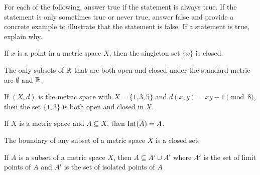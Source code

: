 \begin{comment}
	\item  Let $(X,d)$ be a metric space. Let $\{O_{\alpha}\}$ be a collection of open subsets of $X$ for $\alpha$ in some indexing set $I$ with the property that given any $x \in X$, there exists an $\epsilon_x > 0$ such that $B(x, \epsilon_x) \subseteq O_{\alpha}$ for all but a finite number of sets $O_{\alpha}$ in $\{O_{\alpha}\}$. Let $O = \bigcap_{\alpha \in I} O_{\alpha}$. We will prove that $O$ is open by showing that $X \setminus O$ is closed. 

For each $\alpha \in I$, let $C_{\alpha} = X \setminus O_{\alpha}$. Note that each $C_{\alpha}$ is a closed set. Consider the ball $B(x, \epsilon_x)$. Now $B(x, \epsilon_x) \subseteq O_{\alpha}$ for all but a finite number of sets $O_{\alpha}$, so $B(x, \epsilon_x)$ intersects at most finitely many of the sets $C_{\alpha}$. By part (a), we can conclude that $C = \bigcup_{\alpha \in I} C_{\alpha}$ is closed. Since 
\[X \setminus O = X \setminus \bigcap_{\alpha \in I} O_{\alpha} = \bigcup_{\alpha \in I} X \setminus O_{\alpha} = C,\]
it follows that $O$ is open in $X$. 

	\ea

\end{comment}



\item For each of the following, answer true if the statement is always true. If the statement is only sometimes true or never true, answer false and provide a concrete example to illustrate that the statement is false. If a statement is true, explain why. 
	\ba
	\item If $x$ is a point in a metric space $X$, then the singleton set $\{x\}$ is closed. 

	\item The only subsets of $\mathbb{R}$ that are both open and closed under the standard metric are $\emptyset$ and $\mathbb{R}$. 
	
	\item If $(X,d)$ is the metric space with $X = \{1,3,5\}$ and $d(x,y) = xy - 1 \pmod{8}$, then the set $\{1,3\}$ is both open and closed in $X$.
	
	\item If $X$ is a metric space and $A \subseteq X$, then $\text{Int}(\overline{A}) = A$. 
	
	\item The boundary of any subset of a metric space $X$ is a closed set.
	
	\item If $A$ is a subset of a metric space $X$, then $A \subseteq A' \cup A^i$ where $A'$ is the set of limit points of $A$ and $A^i$ is the set of isolated points of $A$

